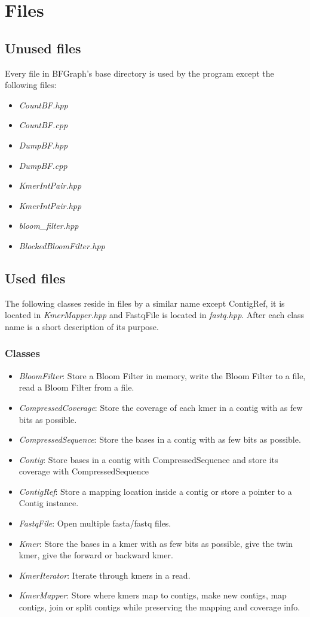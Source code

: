 \documentclass[a4paper]{report}
\renewcommand{\i}[1]{\textit{#1}}  %
\begin{document}
\chapter{Files}

\section{Unused files}
Every file in BFGraph's base directory is used by the program except the following files:

\begin{itemize}
\item \emph{CountBF.hpp}
\item \emph{CountBF.cpp}
\item \emph{DumpBF.hpp}
\item \emph{DumpBF.cpp}
\item \emph{KmerIntPair.hpp}
\item \emph{KmerIntPair.hpp}
\item \emph{bloom\_filter.hpp}
\item \emph{BlockedBloomFilter.hpp}
\end{itemize}

\section{Used files}
The following classes reside in files by a similar name except ContigRef, it is located in \emph{KmerMapper.hpp} and
FastqFile is located in \emph{fastq.hpp}. After each class name is a short description of its purpose.

\subsection{Classes}
\begin{itemize}
\item \i{BloomFilter}: Store a Bloom Filter in memory, write the Bloom Filter to a file, read a Bloom Filter from a file.
\item \i{CompressedCoverage}: Store the coverage of each kmer in a contig with as few bits as possible.
\item \i{CompressedSequence}: Store the bases in a contig with as few bits as possible.
\item \i{Contig}: Store bases in a contig with CompressedSequence and store its coverage with CompressedSequence
\item \i{ContigRef}: Store a mapping location inside a contig or store a pointer to a Contig instance.
\item \i{FastqFile}: Open multiple fasta/fastq files.
\item \i{Kmer}: Store the bases in a kmer with as few bits as possible, give the twin kmer, give the forward or backward kmer. 
\item \i{KmerIterator}: Iterate through kmers in a read.
\item \i{KmerMapper}: Store where kmers map to contigs, make new contigs, map contigs, join or split contigs while preserving the mapping and coverage info.

\end{itemize}
\end{document}
